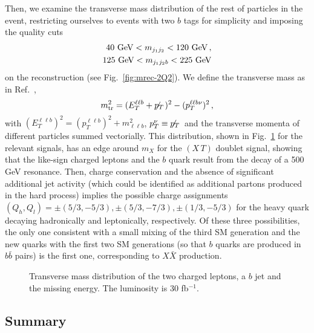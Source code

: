 \documentclass[12pt,a4paper]{article}
\newcommand{\fbin}{fb$^{-1}$}
\newcommand{\XX}{X \bar X}
\newcommand{\XT}{(X \, T)}
\newcommand{\ptmiss}{p_T\!\!\!\!\!\!\!\!\not\,\,\,\,\,\,\,}
\begin{document}
Then, we examine the transverse mass distribution of the rest of particles in the event, restricting ourselves to events with two $b$ tags for simplicity and imposing the quality cuts
\begin{align}
40~\text{GeV} < m_{j_1 j_2} < 120~\text{GeV} \,, \notag \\
125~\text{GeV} < m_{j_1 j_2 b} < 225~\text{GeV}
\end{align}
on the reconstruction (see Fig.~\ref{fig:mrec-2Q2}).
We define the transverse mass as in Ref.~\cite{Contino:2008hi},
\begin{equation}
m_\text{tr}^2 = (E_T^{\ell \ell b} + \ptmiss)^2 - (p_T^{\ell \ell b \nu})^2 \,,
\end{equation}
with $(E_T^{\ell \ell b})^2 = (p_T^{\ell \ell b})^2 + m_{\ell \ell b}^2$, $p_T^\nu \equiv \ptmiss$ and the transverse momenta of different particles summed vectorially. This distribution, shown in Fig.~\ref{fig:mrec3-2Q2} for the relevant signals, has an edge around $m_X$ for the $\XT$ doublet signal, showing that the like-sign charged leptons and the $b$ quark result from the decay of a 500 GeV resonance. Then, charge conservation and the absence of significant additional jet activity (which could be identified as additional partons produced in the hard process) implies the possible charge assignments $(Q_h,Q_l) = \pm (5/3,-5/3),\pm (5/3,-7/3), \pm (1/3,-5/3)$ for the heavy quark decaying 
hadronically and leptonically, respectively. Of these three possibilities, the only one consistent with a small mixing of the third SM generation and the new quarks with the first two SM generations (so that $b$ quarks are produced in $b \bar b$ pairs) is the first one, corresponding to $\XX$ production.

\begin{figure}[htb]
\begin{center}
\caption{Transverse mass distribution of the two charged leptons, a $b$ jet and the missing energy. The luminosity is 30 \fbin.}
\label{fig:mrec3-2Q2}
\end{center}
\end{figure}





\subsection{Summary}
\end{document}
